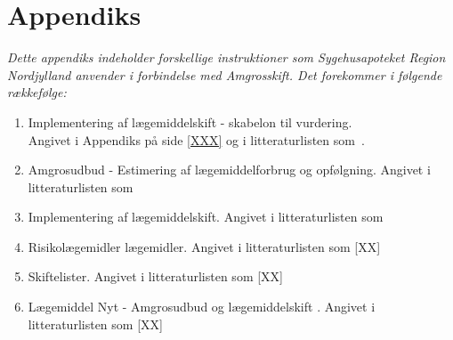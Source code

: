 \chapter{Appendiks} \label{cha:AppD}
\textit{Dette appendiks indeholder forskellige instruktioner som Sygehusapoteket Region Nordjylland anvender i forbindelse med Amgrosskift. Det forekommer i følgende rækkefølge:}

\begin{enumerate}
\item Implementering af lægemiddelskift - skabelon til vurdering. 
\\Angivet i Appendiks på side \ref{XXX} og i litteraturlisten som~\citep{Sygehusapoteket2017}. 
\item Amgrosudbud - Estimering af lægemiddelforbrug og opfølgning. Angivet i litteraturlisten som~\citep{Sygehusapoteket2017a}
\item Implementering af lægemiddelskift. Angivet i litteraturlisten som~\citep{Sygehusapoteket2017b}
\item Risikolægemidler lægemidler. \label{item:Risikolaegemidler} Angivet i litteraturlisten som [XX]
\item Skiftelister. Angivet i litteraturlisten som [XX] \label{item:Skiftelister}
\item Lægemiddel Nyt - Amgrosudbud og lægemiddelskift \label{item:Laegemiddelnyt}. Angivet i litteraturlisten som [XX] 
\end{enumerate}

 \label{app:1}




